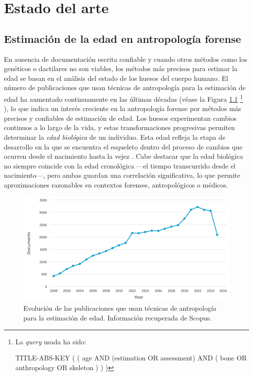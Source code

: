 \chapter{Estado del arte}


\section{Estimación de la edad en antropología forense}

En ausencia de documentación escrita confiable y cuando otros métodos como los genéticos o dactilares no son viables, los métodos más precisos para estimar la edad se basan en el análisis del estado de los huesos del cuerpo humano. El número de publicaciones que usan técnicas de antropología para la estimación de edad ha aumentado continuamente en las últimas décadas (véase la Figura \ref{fig:num_papers_1}%
\footnote{
    La \textit{query} usada ha sido:
    
    TITLE-ABS-KEY ( ( age AND (estimation OR assessment) AND ( bone OR anthropology OR skeleton ) ) ) 
}%
), lo que indica un interés creciente en la antropología forense por métodos más precisos y confiables de estimación de edad.
Los huesos experimentan cambios continuos a lo largo de la vida, y estas transformaciones progresivas permiten determinar la \textit{edad biológica} de un individuo. Esta edad refleja la etapa de desarrollo en la que se encuentra el esqueleto dentro del proceso de cambios que ocurren desde el nacimiento hasta la vejez \cite{byers2023}. Cabe destacar que la edad biológica no siempre coincide con la edad cronológica ---el tiempo transcurrido desde el nacimiento---, pero ambas guardan una correlación significativa, lo que permite aproximaciones razonables en contextos forenses, antropológicos o médicos.

\begin{figure}[htbp]
    \centering
    \includegraphics[width=\textwidth]{capitulos/cap_03/imagenes/num_papers_1.png}
    \caption[
        Evolución de las publicaciones que usan técnicas de antropología para la estimación de edad. 
    ]{
        Evolución de las publicaciones que usan técnicas de antropología para la estimación de edad. 
        Información recuperada de Scopus.
    }
    \label{fig:num_papers_1}
\end{figure}

